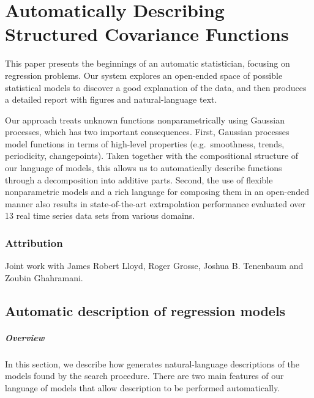 
\inbpdocument


\chapter{Automatically Describing Structured Covariance Functions}
\label{ch:description}





This paper presents the beginnings of an automatic statistician, focusing on regression problems.
Our system explores an open-ended space of possible statistical models to discover a good explanation of the data, and then produces a detailed report with figures and natural-language text.

Our approach treats unknown functions nonparametrically using Gaussian processes, which has two important consequences.
First, Gaussian processes model functions in terms of high-level properties (e.g.\ smoothness, trends, periodicity,
changepoints).
Taken together with the compositional structure of our language of models, this allows us to automatically describe functions through a decomposition into additive parts.
Second, the use of flexible nonparametric models and a rich
language for composing them in an open-ended manner also results
in state-of-the-art extrapolation performance evaluated over 13 real time
series data sets from various domains.


\subsection{Attribution}
Joint work with James Robert Lloyd, Roger Grosse, Joshua B. Tenenbaum and Zoubin Ghahramani.








\section{Automatic description of regression models}
\label{sec:description}

\paragraph{Overview}

In this section, we describe how \procedurename{} generates natural-language descriptions of the models found by the search procedure.
There are two main features of our language of \gp{} models that allow description to be performed automatically.

